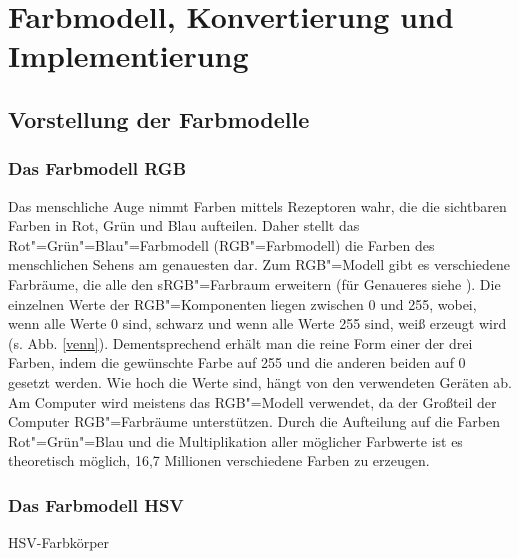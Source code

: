 \documentclass[a4paper,12pt,abstracton,titlepage]{scrartcl}
\begin{document}
\vspace{2em}
\section{Farbmodell, Konvertierung und Implementierung}
\subsection{Vorstellung der Farbmodelle}
\subsubsection{Das Farbmodell RGB} 
Das menschliche Auge nimmt Farben mittels Rezeptoren wahr, die die sichtbaren Farben in Rot, Grün und Blau aufteilen. Daher stellt das Rot"=Grün"=Blau"=Farbmodell (RGB"=Farbmodell) die Farben des menschlichen Sehens am genauesten dar. Zum RGB"=Modell gibt es verschiedene Farbräume, die alle den sRGB"=Farbraum erweitern (für Genaueres siehe \cite{kompendium}). Die einzelnen Werte der RGB"=Komponenten liegen zwischen 0 und 255, wobei, wenn alle Werte 0 sind, schwarz und wenn alle Werte 255 sind, weiß erzeugt wird (s. Abb. \ref{venn}). Dementsprechend erhält man die reine Form einer der drei Farben, indem die gewünschte Farbe auf 255 und die anderen beiden auf 0 gesetzt werden. Wie hoch die Werte sind, hängt von den verwendeten Geräten ab. Am Computer wird meistens das RGB"=Modell verwendet, da der Großteil der Computer RGB"=Farbräume unterstützen. Durch die Aufteilung auf die Farben Rot"=Grün"=Blau und die Multiplikation aller möglicher Farbwerte ist es theoretisch möglich, 16,7 Millionen verschiedene Farben zu erzeugen.

\subsubsection{Das Farbmodell HSV} %
\begin{floatingfigure}[r]{8.3cm}
	\caption{HSV-Farbkörper}
	\label{hsv}
\end{floatingfigure} 
\end{document}
